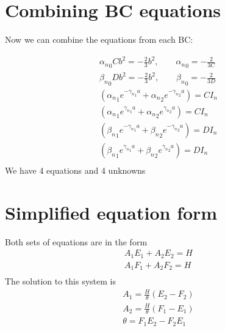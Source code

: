 \documentclass[11pt]{article}
\begin{document}
\section{Combining BC equations}
Now we can combine the equations from each BC:


\begin{equation}\begin{aligned}
{\alpha_n}_0 C b^2 = - \frac{2}{3} b^2, \qquad {\alpha_n}_0 = -\frac{2}{3 C} \\
{\beta_n}_0  D b^2 = - \frac{2}{3} b^2, \qquad {\beta_n}_0  = -\frac{2}{3 D} \\
\left( {\alpha_n}_1 e^{-{\gamma_n}_1 a} + {\alpha_n}_2 e^{-{\gamma_n}_2 a} \right) = C I_n \\
\left( {\alpha_n}_1 e^{ {\gamma_n}_1 a} + {\alpha_n}_2 e^{ {\gamma_n}_2 a} \right) = C I_n \\
\left( {\beta_n}_1  e^{-{\gamma_n}_1 a} + {\beta_n}_2  e^{-{\gamma_n}_2 a} \right) = D I_n \\
\left( {\beta_n}_1  e^{ {\gamma_n}_1 a} + {\beta_n}_2  e^{ {\gamma_n}_2 a} \right) = D I_n \\
\end{aligned} \end{equation}
We have 4 equations and 4 unknowns

\section{Simplified equation form}
Both sets of equations are in the form
\begin{equation}\begin{aligned}
A_1 E_1 + A_2 E_2 = H \\
A_1 F_1 + A_2 F_2 = H \\
\end{aligned} \end{equation}
The solution to this system is
\begin{equation}\begin{aligned}
A_1 = \frac{H}{\theta} (E_2 - F_2) \\
A_2 = \frac{H}{\theta} (F_1 - E_1) \\
\theta = F_1 E_2 - F_2 E_1 \\
\end{aligned} \end{equation}
\end{document}
